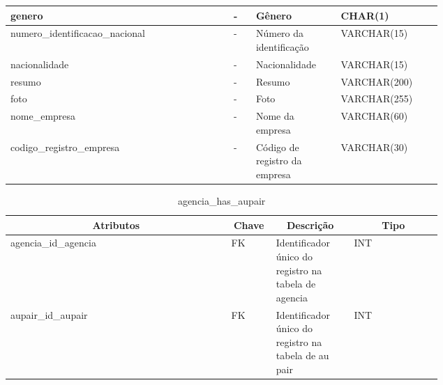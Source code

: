 \begin{enumerate}
\begin{table}[H]
\begin{tabular}{|p{0.40\linewidth} | p{0.04\linewidth} |  p{0.12\linewidth} | p{0.16\linewidth} |}
        genero  &  
        - & 
        Gênero &
        CHAR(1)
        \\  \hline
        
        numero\_identificacao\_nacional  &  
        - & 
        Número da identificação &
        VARCHAR(15)
        \\  \hline
        
        nacionalidade  &  
        - & 
        Nacionalidade &
        VARCHAR(15)
        \\  \hline
        
        resumo  &  
        - & 
        Resumo &
        VARCHAR(200)
        \\  \hline
        
        foto  &  
        - & 
        Foto &
        VARCHAR(255)
        \\  \hline
        
        nome\_empresa  &  
        - & 
        Nome da empresa &
        VARCHAR(60)
        \\  \hline
        
        codigo\_registro\_empresa  &  
        - & 
        Código de registro da empresa &
        VARCHAR(30)
        \\  \hline
       
        \end{tabular}
    \end{table}
\end{enumerate}

\begin{enumerate}
    \begin{table}[H]
    \caption{agencia\_has\_aupair}
    \label{idioma}
    	\centering\footnotesize
        \begin{tabular}{|p{0.40\linewidth} | p{0.04\linewidth} |  p{0.12\linewidth} | p{0.16\linewidth} |}  \hline
        \multicolumn{1}{|c|}{\textbf{Atributos}} &
        \multicolumn{1}{|c|}{\textbf{Chave}} &
        \multicolumn{1}{c|}{\textbf{Descrição}} &
        \multicolumn{1}{c|}{\textbf{Tipo}} \\ \hline
          
        agencia\_id\_agencia  &  
        FK & 
        Identificador único do registro na tabela de agencia &
        INT
        \\  \hline
        
        aupair\_id\_aupair &  
        FK & 
        Identificador único do registro na tabela de au pair &
        INT
        \\  \hline
       
        \end{tabular}
    \end{table}
\end{enumerate}

